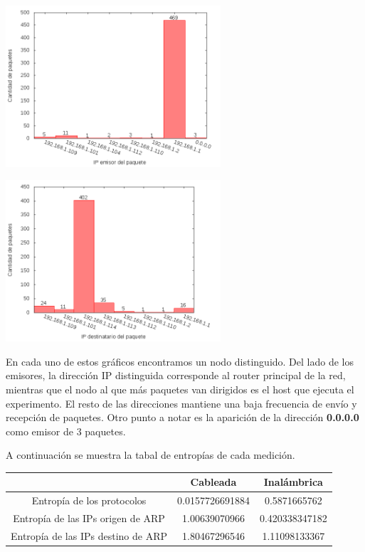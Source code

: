 \begin{minipage}{8cm}
  \centering
  \includegraphics[width=8cm]{../mediciones/home-wfi-10/home-wfi-10IpsSrcArp.png}
\end{minipage}%
\begin{minipage}{8cm}
  \centering
  \includegraphics[width=8cm]{../mediciones/home-wfi-10/home-wfi-10IpsDstArp.png}
\end{minipage}


En cada uno de estos gráficos encontramos un nodo distinguido. Del lado de los emisores, la dirección IP distinguida corresponde al
router principal de la red, mientras que el nodo al que más paquetes van dirigidos es el host que ejecuta el experimento. El resto
de las direcciones mantiene una baja frecuencia de envío y recepción de paquetes. Otro punto a notar es la aparición de la dirección
\textbf{0.0.0.0} como emisor de 3 paquetes.

A continuación se muestra la tabal de entropías de cada medición.

\begin{center}
\begin{tabular}{|c||c|c|}
\hline
 & Cableada & Inalámbrica \\
\hline
\hline
Entropía de los protocolos & 0.0157726691884 & 0.5871665762 \\
\hline
Entropía de las IPs origen de ARP & 1.00639070966 & 0.420338347182 \\
\hline
Entropía de las IPs destino de ARP & 1.80467296546 & 1.11098133367 \\
\hline
\end{tabular}
\end{center}


